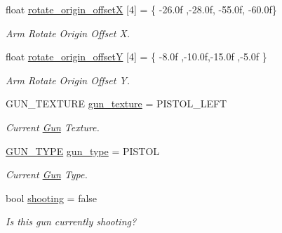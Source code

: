 \begin{DoxyCompactItemize}
\mbox{\label{class_gun_ae5eecdc9ee8d0b71c338173cbe72bd92}} 
float \mbox{\hyperlink{class_gun_ae5eecdc9ee8d0b71c338173cbe72bd92}{rotate\+\_\+origin\+\_\+offsetX}} \mbox{[}4\mbox{]} = \{ -\/26.\+0f ,-\/28.\+0f, -\/55.\+0f, -\/60.\+0f\}
\begin{DoxyCompactList}\small\item\em Arm Rotate Origin Offset X. \end{DoxyCompactList}\item 
\mbox{\label{class_gun_a1a73a7ecb2afaf3542762e6eb1bfcd32}} 
float \mbox{\hyperlink{class_gun_a1a73a7ecb2afaf3542762e6eb1bfcd32}{rotate\+\_\+origin\+\_\+offsetY}} \mbox{[}4\mbox{]} = \{ -\/8.\+0f ,-\/10.\+0f,-\/15.\+0f ,-\/5.\+0f \}
\begin{DoxyCompactList}\small\item\em Arm Rotate Origin Offset Y. \end{DoxyCompactList}\item 
\mbox{\label{class_gun_a92a45d2bb8d317040e7148a7ae5d94ee}} 
G\+U\+N\+\_\+\+T\+E\+X\+T\+U\+RE \mbox{\hyperlink{class_gun_a92a45d2bb8d317040e7148a7ae5d94ee}{gun\+\_\+texture}} = P\+I\+S\+T\+O\+L\+\_\+\+L\+E\+FT
\begin{DoxyCompactList}\small\item\em Current \mbox{\hyperlink{class_gun}{Gun}} Texture. \end{DoxyCompactList}\item 
\mbox{\label{class_gun_a1db772cd24d846fc65580bb3d033324b}} 
\mbox{\hyperlink{class_gun_aaeeca616af10d56012d8a77b565ccccd}{G\+U\+N\+\_\+\+T\+Y\+PE}} \mbox{\hyperlink{class_gun_a1db772cd24d846fc65580bb3d033324b}{gun\+\_\+type}} = P\+I\+S\+T\+OL
\begin{DoxyCompactList}\small\item\em Current \mbox{\hyperlink{class_gun}{Gun}} Type. \end{DoxyCompactList}\item 
\mbox{\label{class_gun_a0e502425530738ba7abf8d9a4280ac5f}} 
bool \mbox{\hyperlink{class_gun_a0e502425530738ba7abf8d9a4280ac5f}{shooting}} = false
\begin{DoxyCompactList}\small\item\em Is this gun currently shooting? \end{DoxyCompactList}\item 

\end{DoxyCompactItemize}
